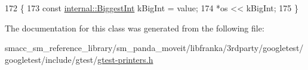 \begin{DoxyCode}
172                                                          \{
173     \textcolor{keyword}{const} \hyperlink{namespacetesting_1_1internal_a05c6bd9ede5ccdf25191a590d610dcc6}{internal::BiggestInt} kBigInt = value;
174     *os << kBigInt;
175   \}
\end{DoxyCode}


The documentation for this class was generated from the following file\+:\begin{DoxyCompactItemize}
\item 
smacc\+\_\+sm\+\_\+reference\+\_\+library/sm\+\_\+panda\+\_\+moveit/libfranka/3rdparty/googletest/googletest/include/gtest/\hyperlink{gtest-printers_8h}{gtest-\/printers.\+h}\end{DoxyCompactItemize}
